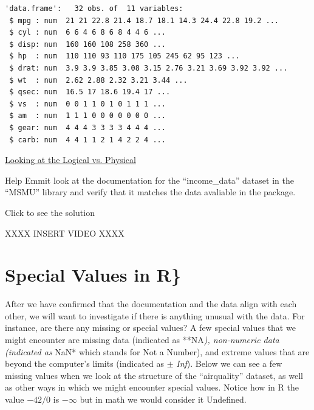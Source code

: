 \documentclass[
  letterpaper,
  DIV=11,
  numbers=noendperiod]{scrreprt}
\begin{document}
\begin{verbatim}
'data.frame':   32 obs. of  11 variables:
 $ mpg : num  21 21 22.8 21.4 18.7 18.1 14.3 24.4 22.8 19.2 ...
 $ cyl : num  6 6 4 6 8 6 8 4 4 6 ...
 $ disp: num  160 160 108 258 360 ...
 $ hp  : num  110 110 93 110 175 105 245 62 95 123 ...
 $ drat: num  3.9 3.9 3.85 3.08 3.15 2.76 3.21 3.69 3.92 3.92 ...
 $ wt  : num  2.62 2.88 2.32 3.21 3.44 ...
 $ qsec: num  16.5 17 18.6 19.4 17 ...
 $ vs  : num  0 0 1 1 0 1 0 1 1 1 ...
 $ am  : num  1 1 1 0 0 0 0 0 0 0 ...
 $ gear: num  4 4 4 3 3 3 3 4 4 4 ...
 $ carb: num  4 4 1 1 2 1 4 2 2 4 ...
\end{verbatim}

\begin{watch}{}{}
    \href{https://youtu.be/e70L-Zy__0I}{Looking at the Logical vs. Physical}
\end{watch}

\begin{tcolorbox}[enhanced jigsaw, colbacktitle=quarto-callout-tip-color!10!white, breakable, bottomrule=.15mm, colframe=quarto-callout-tip-color-frame, left=2mm, opacitybacktitle=0.6, title=\textcolor{quarto-callout-tip-color}{\faLightbulb}\hspace{0.5em}{Try it Out}, leftrule=.75mm, opacityback=0, rightrule=.15mm, titlerule=0mm, bottomtitle=1mm, colback=white, toprule=.15mm, arc=.35mm, toptitle=1mm, coltitle=black]

Help Emmit look at the documentation for the ``income\_data'' dataset in
the ``MSMU'' library and verify that it matches the data avaliable in
the package.

Click to see the solution

XXXX INSERT VIDEO XXXX

\end{tcolorbox}

\section{Special Values in R\}}\label{special-values-in-r}

After we have confirmed that the documentation and the data align with
each other, we will want to investigate if there is anything unusual
with the data. For instance, are there any missing or special values? A
few special values that we might encounter are missing data (indicated
as **NA\emph{), non-numeric data (indicated as }NaN* which stands for
Not a Number), and extreme values that are beyond the computer's limits
(indicated as \(\pm\) \emph{Inf}). Below we can see a few missing values
when we look at the structure of the ``airquality'' dataset, as well as
other ways in which we might encounter special values. Notice how in R
the value \(-42/0\) is \(-\infty\) but in math we would consider it
Undefined.
\end{document}
